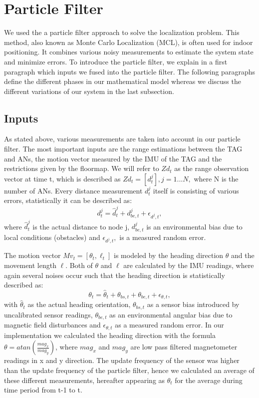 


\section{Particle Filter}
We used the a particle filter approach to solve the localization problem. This method, also known as Monte Carlo Localization (MCL), is often used for indoor positioning. It combines various noisy measurements to estimate the system state and minimize errors. To introduce the particle filter, we explain in a first paragraph which inputs we fused into the particle filter. The following paragraphs define the different phases in our mathematical model whereas we discuss the different variations of our system in the last subsection.

\subsection{Inputs}
As stated above, various measurements are taken into account in our particle filter. The most important inputs are the range estimations between the TAG and ANs, the motion vector measured by the IMU of the TAG and the restrictions given by the floormap. We will refer to $Zd_{t}$ as the range observation vector at time t, which is described as $Zd_{t} = [d^{j}_{t}], j = 1...N,$ where N is the number of ANs. Every distance measurement $d^{j}_{t}$ itself is consisting of various errors, statistically it can be described as: 
$$d^{j}_{t} = \hat{d}^{j}_{t} + d^{j}_{be, t} + \epsilon_{d^{j}, t},$$
where $\hat{d}^{j}_{t}$ is the actual distance to node j, $d^{j}_{be, t}$ is an environmental bias due to local conditions (obstacles) and $\epsilon_{d^{j}, t},$ is a measured random error.

The motion vector $Mv_{t} = [\theta_{t}, \ell_{t}]$ is modeled by the heading direction $\theta$ and the movement length $\ell$. Both of $\theta$ and $\ell$ are calculated by the IMU readings, where again several noises occur such that the heading direction is statistically described as:
$$\theta_{t} = \hat{\theta}_{t} + \theta_{bs,t} + \theta_{be,t} + \epsilon_{\theta, t},$$
with $\hat{\theta}_{t}$ as the actual heading orientation,  $\theta_{bs,t}$ as a sensor bias introduced by uncalibrated sensor readings, $\theta_{be,t}$ as an environmental angular bias due to magnetic field disturbances and $\epsilon_{\theta, t}$ as a measured random error. 
In our implementation we calculated the heading direction with the formula $\theta = atan(\frac{mag_{x}}{mag_{y}})$, where $mag_{x}$ and $mag_{y}$ are low pass filtered magnetometer readings in x and y direction. The update frequency of the sensor was higher than the update frequency of the particle filter, hence we calculated an average of these different measurements, hereafter appearing as $\theta_{t}$ for the average during time period from t-1 to t.

